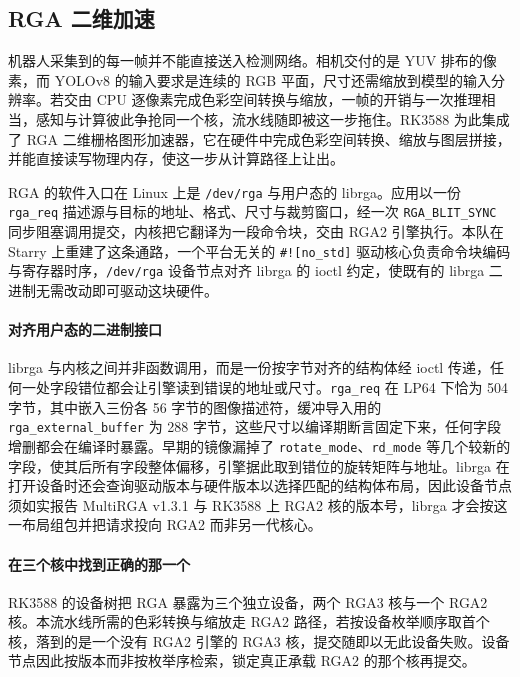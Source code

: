 \subsection{RGA 二维加速}\label{sec:rga}

机器人采集到的每一帧并不能直接送入检测网络。相机交付的是 YUV 排布的像素，而 YOLOv8 的输入要求是连续的 RGB 平面，尺寸还需缩放到模型的输入分辨率。若交由 CPU 逐像素完成色彩空间转换与缩放，一帧的开销与一次推理相当，感知与计算彼此争抢同一个核，流水线随即被这一步拖住。RK3588 为此集成了 RGA 二维栅格图形加速器，它在硬件中完成色彩空间转换、缩放与图层拼接，并能直接读写物理内存，使这一步从计算路径上让出。


RGA 的软件入口在 Linux 上是 \texttt{/dev/rga} 与用户态的 librga。应用以一份 \texttt{rga\_req} 描述源与目标的地址、格式、尺寸与裁剪窗口，经一次 \texttt{RGA\_BLIT\_SYNC} 同步阻塞调用提交，内核把它翻译为一段命令块，交由 RGA2 引擎执行。本队在 Starry 上重建了这条通路，一个平台无关的 \texttt{\#![no\_std]} 驱动核心负责命令块编码与寄存器时序，\texttt{/dev/rga} 设备节点对齐 librga 的 ioctl 约定，使既有的 librga 二进制无需改动即可驱动这块硬件。

\paragraph{对齐用户态的二进制接口}
librga 与内核之间并非函数调用，而是一份按字节对齐的结构体经 ioctl 传递，任何一处字段错位都会让引擎读到错误的地址或尺寸。\texttt{rga\_req} 在 LP64 下恰为 504 字节，其中嵌入三份各 56 字节的图像描述符，缓冲导入用的 \texttt{rga\_external\_buffer} 为 288 字节，这些尺寸以编译期断言固定下来，任何字段增删都会在编译时暴露。早期的镜像漏掉了 \texttt{rotate\_mode}、\texttt{rd\_mode} 等几个较新的字段，使其后所有字段整体偏移，引擎据此取到错位的旋转矩阵与地址。librga 在打开设备时还会查询驱动版本与硬件版本以选择匹配的结构体布局，因此设备节点须如实报告 MultiRGA v1.3.1 与 RK3588 上 RGA2 核的版本号，librga 才会按这一布局组包并把请求投向 RGA2 而非另一代核心。

\paragraph{在三个核中找到正确的那一个}
RK3588 的设备树把 RGA 暴露为三个独立设备，两个 RGA3 核与一个 RGA2 核。本流水线所需的色彩转换与缩放走 RGA2 路径，若按设备枚举顺序取首个核，落到的是一个没有 RGA2 引擎的 RGA3 核，提交随即以无此设备失败。设备节点因此按版本而非按枚举序检索，锁定真正承载 RGA2 的那个核再提交。

